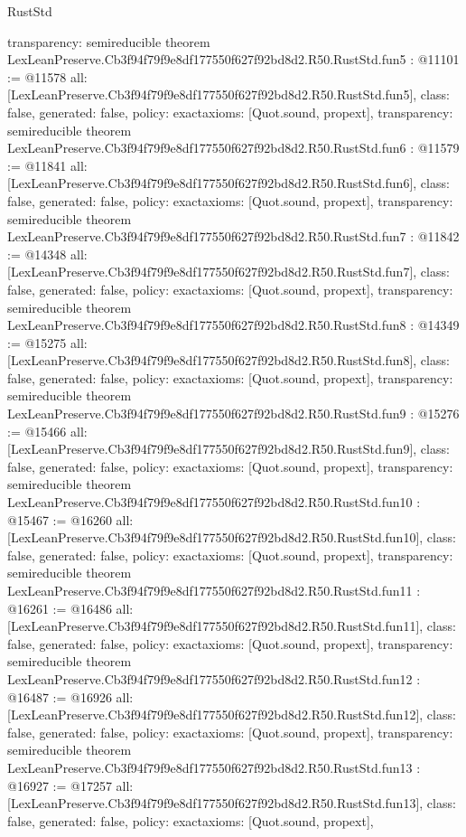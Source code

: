 \begin{lexlean}{RustStd}
\begin{coremodule}
{  transparency: semireducible
}
theorem LexLeanPreserve.Cb3f94f79f9e8df177550f627f92bd8d2.R50.RustStd.fun5 : @11101 := @11578 {
  all: [LexLeanPreserve.Cb3f94f79f9e8df177550f627f92bd8d2.R50.RustStd.fun5],
  class: false,
  generated: false,
  policy: exact{axioms: [Quot.sound, propext]},
  transparency: semireducible
}
theorem LexLeanPreserve.Cb3f94f79f9e8df177550f627f92bd8d2.R50.RustStd.fun6 : @11579 := @11841 {
  all: [LexLeanPreserve.Cb3f94f79f9e8df177550f627f92bd8d2.R50.RustStd.fun6],
  class: false,
  generated: false,
  policy: exact{axioms: [Quot.sound, propext]},
  transparency: semireducible
}
theorem LexLeanPreserve.Cb3f94f79f9e8df177550f627f92bd8d2.R50.RustStd.fun7 : @11842 := @14348 {
  all: [LexLeanPreserve.Cb3f94f79f9e8df177550f627f92bd8d2.R50.RustStd.fun7],
  class: false,
  generated: false,
  policy: exact{axioms: [Quot.sound, propext]},
  transparency: semireducible
}
theorem LexLeanPreserve.Cb3f94f79f9e8df177550f627f92bd8d2.R50.RustStd.fun8 : @14349 := @15275 {
  all: [LexLeanPreserve.Cb3f94f79f9e8df177550f627f92bd8d2.R50.RustStd.fun8],
  class: false,
  generated: false,
  policy: exact{axioms: [Quot.sound, propext]},
  transparency: semireducible
}
theorem LexLeanPreserve.Cb3f94f79f9e8df177550f627f92bd8d2.R50.RustStd.fun9 : @15276 := @15466 {
  all: [LexLeanPreserve.Cb3f94f79f9e8df177550f627f92bd8d2.R50.RustStd.fun9],
  class: false,
  generated: false,
  policy: exact{axioms: [Quot.sound, propext]},
  transparency: semireducible
}
theorem LexLeanPreserve.Cb3f94f79f9e8df177550f627f92bd8d2.R50.RustStd.fun10 : @15467 := @16260 {
  all: [LexLeanPreserve.Cb3f94f79f9e8df177550f627f92bd8d2.R50.RustStd.fun10],
  class: false,
  generated: false,
  policy: exact{axioms: [Quot.sound, propext]},
  transparency: semireducible
}
theorem LexLeanPreserve.Cb3f94f79f9e8df177550f627f92bd8d2.R50.RustStd.fun11 : @16261 := @16486 {
  all: [LexLeanPreserve.Cb3f94f79f9e8df177550f627f92bd8d2.R50.RustStd.fun11],
  class: false,
  generated: false,
  policy: exact{axioms: [Quot.sound, propext]},
  transparency: semireducible
}
theorem LexLeanPreserve.Cb3f94f79f9e8df177550f627f92bd8d2.R50.RustStd.fun12 : @16487 := @16926 {
  all: [LexLeanPreserve.Cb3f94f79f9e8df177550f627f92bd8d2.R50.RustStd.fun12],
  class: false,
  generated: false,
  policy: exact{axioms: [Quot.sound, propext]},
  transparency: semireducible
}
theorem LexLeanPreserve.Cb3f94f79f9e8df177550f627f92bd8d2.R50.RustStd.fun13 : @16927 := @17257 {
  all: [LexLeanPreserve.Cb3f94f79f9e8df177550f627f92bd8d2.R50.RustStd.fun13],
  class: false,
  generated: false,
  policy: exact{axioms: [Quot.sound, propext]},
}
\end{coremodule}
\end{lexlean}

